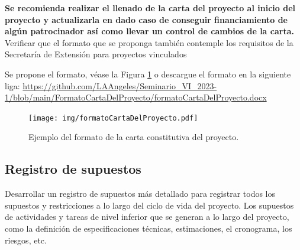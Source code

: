 \documentclass[letterpaper,12pt,openright,oneside]{article}
\theoremstyle{plain}
\begin{document}
\textbf{Se recomienda realizar el llenado de la carta del proyecto al inicio del proyecto y actualizarla en dado caso de conseguir financiamiento de algún patrocinador así como llevar un control de cambios de la carta.}
Verificar que el formato que se proponga también contemple los requisitos de la Secretaría de Extensión para proyectos vinculados

Se propone el formato, véase la Figura \ref{CartaConstitutiva} o descargue el formato en la siguiente liga: \url{https://github.com/LAAngeles/Seminario_VI_2023-1/blob/main/FormatoCartaDelProyecto/formatoCartaDelProyecto.docx}
% 
% 
\begin{figure}[h]
    \centering
    \texttt{[image: img/formatoCartaDelProyecto.pdf]}
    \caption{Ejemplo del formato de la carta constitutiva del proyecto.}
    \label{CartaConstitutiva}
\end{figure}
% 
% 
\subsection*{Registro de supuestos}

Desarrollar un registro de supuestos más detallado para registrar todos los supuestos y restricciones a lo largo del ciclo de vida del proyecto.
Los supuestos de actividades y tareas de nivel inferior que se generan a lo largo del proyecto, como la definición de especificaciones técnicas, estimaciones, el cronograma, los riesgos, etc. 
% 
% 
\end{document}
